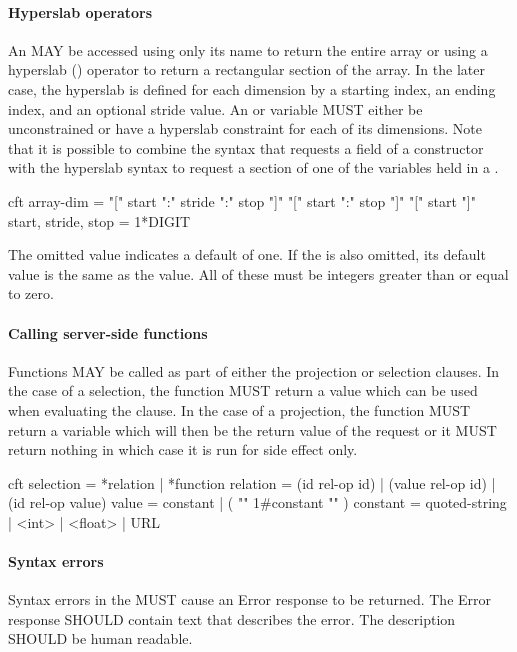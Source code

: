 \documentclass[justify]{nasa-ese}
\begin{document}
\paragraph{Hyperslab operators}
An \Array MAY be accessed using only its name to return the entire array or
using a hyperslab (\lit{[]}) operator to return a rectangular section of
the array. In the later case, the hyperslab is defined for each dimension by
a starting index, an ending index, and an optional stride value. An \Array or
\Grid variable MUST either be unconstrained or have a hyperslab constraint for
each of its dimensions. Note that it is possible to combine the syntax that
requests a field of a constructor with the \Array hyperslab syntax to request
a section of one of the \Array variables held in a \Grid.

\begin{vcode}{cft}
array-dim = "[" start ":" stride ":" stop "]" 
            "[" start ":" stop "]"
            "[" start "]" 
start, stride, stop = 1*DIGIT 
\end{vcode}
\label{grammar-fix-08.28.07-1}

The omitted  value indicates a default of one.  If the
 is also omitted, its default value is the same as the
 value.  All of these must be integers greater than or
equal to zero.

\paragraph{Calling server-side functions}
Functions MAY be called as part of either the projection or selection
clauses. In the case of a selection, the function MUST return a value which
can be used when evaluating the clause. In the case of a projection, the
function MUST return a \DAP variable which will then be the return value of
the request or it MUST return nothing in which case it is run for side effect
only. 

\begin{vcode}{cft}
selection = *relation | *function 
relation  = (id rel-op id) | (value rel-op id) 
            | (id rel-op value) 
value     = constant | ( "{" 1#constant "}" ) 
constant  = quoted-string | <int> | <float> | URL 
\end{vcode}

\paragraph{Syntax errors}
Syntax errors in the \CE MUST cause an Error response to be returned. The
Error response SHOULD contain text that describes the error. The description
SHOULD be human readable.
\end{document}
